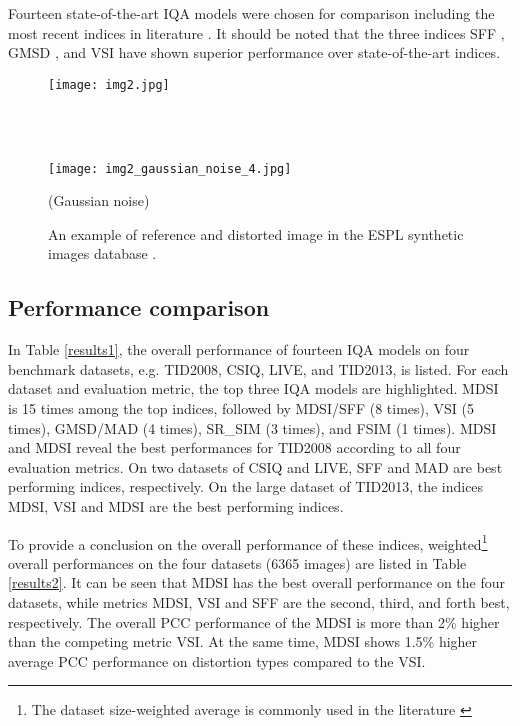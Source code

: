 Fourteen state-of-the-art IQA models were chosen for comparison \cite{SSIM, MSSSIM, VIF, GS, MAD, IWSSIM, RFSIM, SRSIM, FSIM, GMSD, SFF, VSI} including the most recent indices in literature \cite{SFF, GMSD, VSI}. It should be noted that the three indices SFF \cite{SFF}, GMSD \cite{GMSD}, and VSI \cite{VSI} have shown superior performance over state-of-the-art indices.        



\begin{figure}[htb]
\scriptsize
\begin{minipage}[b]{0.99\linewidth}
  \centering
  \centerline{\texttt{[image: img2.jpg]}} 
  \vspace{0.10cm}
\centerline{}
\end{minipage}
\\ \\
\begin{minipage}[b]{.99\linewidth}
  \centering
  \centerline{\texttt{[image: img2\_gaussian\_noise\_4.jpg]}}
  \vspace{0.10cm}
\centerline{ (Gaussian noise)}
\end{minipage}
\caption{An example of reference  and distorted  image in the ESPL synthetic images database \cite{ESPL}.}
\label{fig:synthetic}
\end{figure}


   


\subsection{Performance comparison}
\label{performance}

In Table \ref{results1}, the overall performance of fourteen IQA models on four benchmark datasets, e.g. TID2008, CSIQ, LIVE, and TID2013, is listed. For each dataset and evaluation metric, the top three IQA models are highlighted. MDSI is 15 times among the top indices, followed by MDSI/SFF (8 times), VSI (5 times), GMSD/MAD (4 times), SR\_SIM (3 times), and FSIM (1 times). MDSI and MDSI reveal the best performances for TID2008 according to all four evaluation metrics. On two datasets of CSIQ and LIVE, SFF and MAD are best performing indices, respectively. On the large dataset of TID2013, the indices MDSI, VSI and MDSI are the best performing indices. 

To provide a conclusion on the overall performance of these indices, weighted\footnote{The dataset size-weighted average is commonly used in the literature \cite{IWSSIM, SFF, GMSD, VSI}} overall performances on the four datasets (6365 images) are listed in Table \ref{results2}. It can be seen that MDSI has the best overall performance on the four datasets, while metrics MDSI, VSI and SFF are the second, third, and forth best, respectively. The overall PCC performance of the MDSI is more than 2\% higher than the competing metric VSI. At the same time, MDSI shows 1.5\% higher average PCC performance on distortion types compared to the VSI. 




